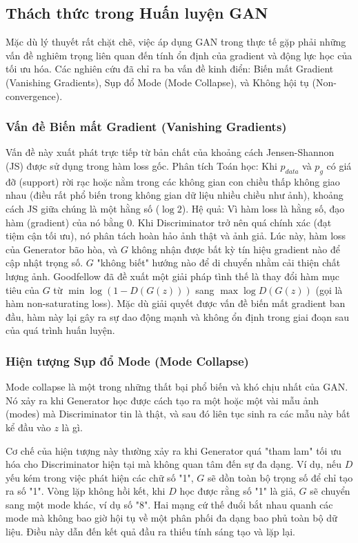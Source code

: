 \subsection{Thách thức trong Huấn luyện GAN}
Mặc dù lý thuyết rất chặt chẽ, việc áp dụng GAN trong thực tế gặp phải những vấn đề nghiêm trọng 
liên quan đến tính ổn định của gradient và động lực học của tối ưu hóa. Các nghiên cứu đã chỉ ra 
ba vấn đề kinh điển: Biến mất Gradient (Vanishing Gradients), Sụp đổ Mode (Mode Collapse), và 
Không hội tụ (Non-convergence).

\newpage
\subsubsection{Vấn đề Biến mất Gradient (Vanishing Gradients)}
Vấn đề này xuất phát trực tiếp từ bản chất của khoảng cách Jensen-Shannon (JS) được sử dụng trong 
hàm loss gốc. Phân tích Toán học: Khi $p_{data}$ và $p_g$ có giá đỡ (support) rời rạc hoặc nằm 
trong các không gian con chiều thấp không giao nhau (điều rất phổ biến trong không gian dữ liệu 
nhiều chiều như ảnh), khoảng cách JS giữa chúng là một hằng số ($\log 2$).
Hệ quả: Vì hàm loss là hằng số, đạo hàm (gradient) của nó bằng 0. Khi Discriminator trở nên 
quá chính xác (đạt tiệm cận tối ưu), nó phân tách hoàn hảo ảnh thật và ảnh giả. Lúc này, hàm 
loss của Generator bão hòa, và $G$ không nhận được bất kỳ tín hiệu gradient nào để cập nhật 
trọng số. $G$ "không biết" hướng nào để di chuyển nhằm cải thiện chất lượng ảnh.
Goodfellow đã đề xuất một giải pháp tình thế là thay đổi hàm mục tiêu của $G$ 
từ $\min \log(1 - D(G(z)))$ sang $\max \log D(G(z))$ (gọi là hàm non-saturating loss). 
Mặc dù giải quyết được vấn đề biến mất gradient ban đầu, hàm này lại gây ra sự dao động 
mạnh và không ổn định trong giai đoạn sau của quá trình huấn luyện.\cite{Goodfellow2014}

\subsubsection{Hiện tượng Sụp đổ Mode (Mode Collapse)}

Mode collapse là một trong những thất bại phổ biến và khó chịu nhất của GAN. Nó xảy ra khi 
Generator học được cách tạo ra một hoặc một vài mẫu ảnh (modes) mà Discriminator tin là thật, 
và sau đó liên tục sinh ra các mẫu này bất kể đầu vào $z$ là gì.\cite{Salimans2016}

Cơ chế của hiện tượng này thường xảy ra khi Generator quá "tham lam" tối ưu hóa cho 
Discriminator hiện tại mà không quan tâm đến sự đa dạng. Ví dụ, nếu $D$ yếu kém trong 
việc phát hiện các chữ số "1", $G$ sẽ dồn toàn bộ trọng số để chỉ tạo ra số "1".
Vòng lặp không hồi kết, khi $D$ học được rằng số "1" là giả, $G$ sẽ chuyển sang một mode 
khác, ví dụ số "8". Hai mạng cứ thế đuổi bắt nhau quanh các mode mà không bao giờ hội tụ 
về một phân phối đa dạng bao phủ toàn bộ dữ liệu. Điều này dẫn đến kết quả đầu ra thiếu tính
sáng tạo và lặp lại.


